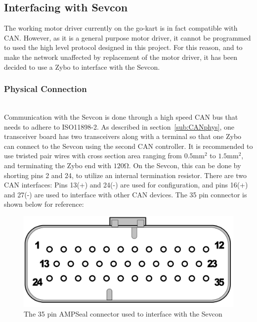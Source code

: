 

\subsection{Interfacing with Sevcon}\label{sub:Sevcon_interfacing}
The working motor driver currently on the go-kart is in fact compatible with CAN.
However, as it is a general purpose motor driver, it cannot be programmed to used the high level protocol designed in this project. 
For this reason, and to make the network unaffected by replacement of the motor driver, it has been decided to use a Zybo to interface with the Sevcon.

\subsubsection{Physical Connection}\label{sub:sevcon_physical_connection}~\\
Communication with the Sevcon is done through a high speed CAN bus that needs to adhere to ISO11898-2.
As described in section~\ref{sub:CANphys}, one transceiver board has two transceivers along with a terminal so that one Zybo can connect to the Sevcon using the second CAN controller.
It is recommended to use twisted pair wires with cross section area ranging from $0.5 \si{\milli \meter \squared}$ to $1.5 \si{\milli \meter \squared}$, and terminating the Zybo end with $120 \si{\ohm}$.
On the Sevcon, this can be done by shorting pins 2 and 24, to utilize an internal termination resistor.
There are two CAN interfaces: Pins 13(+) and 24(-) are used for configuration, and pins 16(+) and 27(-) are used to interface with other CAN devices.
The 35 pin connector is shown below for reference:

\begin{figure}[h]
	\centering
	\includegraphics[width = 0.5\linewidth]{graphics/35_pin_dsub}
	\caption{The 35 pin AMPSeal connector used to interface with the Sevcon}
	\label{fig:35_pin_dsub}
\end{figure}

